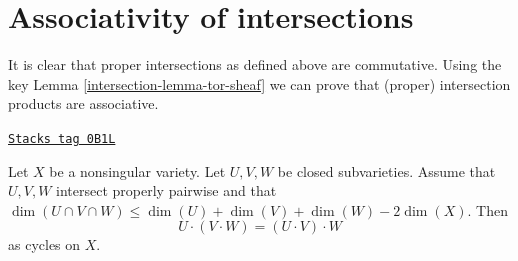 \section{Associativity of intersections}
\label{intersection-section-associative}
It is clear that proper intersections as defined above are commutative.
Using the key Lemma \ref{intersection-lemma-tor-sheaf} we can prove that (proper)
intersection products are associative.

\begin{lemma}[Associative]
\label{intersection-lemma-associative}
\href{https://stacks.math.columbia.edu/tag/0B1L}{\texttt{Stacks tag 0B1L}}

Let $X$ be a nonsingular variety. Let $U, V, W$ be closed
subvarieties. Assume that $U, V, W$ intersect properly pairwise
and that $\dim(U \cap V \cap W) \leq \dim(U) + \dim(V) + \dim(W) - 2\dim(X)$.
Then
$$
U \cdot (V \cdot W) = (U \cdot V) \cdot W
$$
as cycles on $X$.
\end{lemma}

